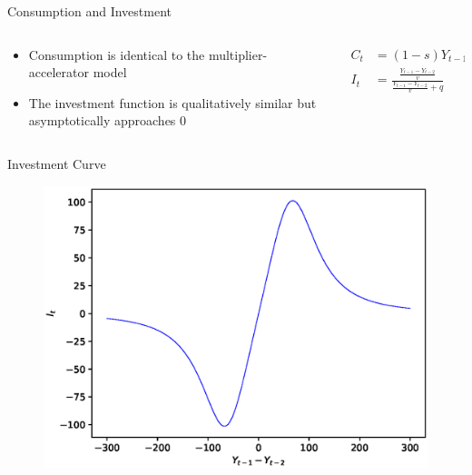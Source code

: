 \documentclass{beamer}
\begin{document}
\begin{frame}{Consumption and Investment}
	\begin{columns}
	\begin{column}{0.5\textwidth}
		\begin{itemize}
			\item Consumption is identical to the multiplier-accelerator model
			\item The investment function is qualitatively similar but asymptotically approaches 0
		\end{itemize}
	\end{column}
	\begin{column}{0.5\textwidth}
		\begin{align*}
			C_t &= (1-s)Y_{t-1}+sY_{t-2}\\
			I_t &= \frac{\frac{Y_{t-1}-Y_{t-2}}{v}}{\frac{Y_{t-1}-Y_{t-2}}{v}+q}
		\end{align*}
	\end{column}
	\end{columns}
\end{frame}

\begin{frame}{Investment Curve}
	\begin{figure}
		\centering
		\includegraphics[height=0.9\textheight]{investment.eps}
	\end{figure}
\end{frame}
\end{document}
